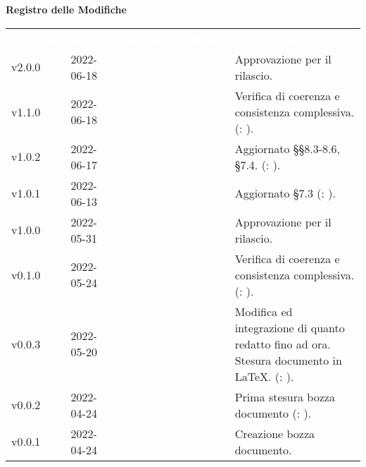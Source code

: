 
{\LARGE{\textbf{Registro delle Modifiche}}} \\
\renewcommand{\arraystretch}{1.5}
\begin{longtable}{ m{}<{\centering}  m{}<{\centering}  m{}<{\centering}  m{}<{\centering}  m{}<{\centering} }
	\rowcolor{darkblue}
	\textcolor{white}{\textbf{Versione}} &\textcolor{white}{\textbf{Data}}& \textcolor{white}{\textbf{Nominativo}} & \textcolor{white}{\textbf{Ruolo}}&\textcolor{white}{\textbf{Descrizione}}\\ 

	v2.0.0 & 2022-06-18 & \MG & \RE & Approvazione per il rilascio.	 \\
	
	v1.1.0 & 2022-06-18 & \GC & \PR & Verifica di coerenza e consistenza complessiva. (\VE: \textit{\PV}). \\	

	v1.0.2 & 2022-06-17 & \GC & \PR & Aggiornato \S\S{8.3-8.6}, \S{7.4}. (\VE: \textit{\PV}). \\

	v1.0.1 & 2022-06-13 & \GC & \PR & Aggiornato \S{7.3} (\VE: \textit{\PV}).\\

	v1.0.0 & 2022-05-31 & \MG & \RE & Approvazione per il rilascio.	 \\
	
	v0.1.0 & 2022-05-24 & \GC & \PR & Verifica di coerenza e consistenza complessiva. (\VE: \textit{\PV}). \\

	v0.0.3 & 2022-05-20 & \GC & \PR & Modifica ed integrazione di quanto redatto fino ad ora. Stesura documento in \LaTeX{}. (\VE: \textit{\PV}). \\

	v0.0.2 & 2022-04-24 & \GC & \PR & Prima stesura bozza documento (\VE: \textit{\PV}). \\

	v0.0.1 & 2022-04-24 & \GC & \PR & Creazione bozza documento. \\

\end{longtable}

\pagebreak